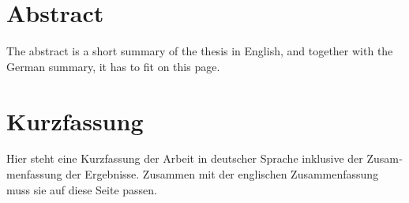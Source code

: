 \thispagestyle{plain}

\section*{Abstract}
The abstract is a short summary of the thesis in English, and together with the German summary, it has to fit on this page.

\section*{Kurzfassung}
\begin{otherlanguage}{ngerman}
Hier steht eine Kurzfassung der Arbeit in deutscher Sprache inklusive der Zusammenfassung der
Ergebnisse.
Zusammen mit der englischen Zusammenfassung muss sie auf diese Seite passen.
\end{otherlanguage}


